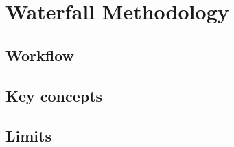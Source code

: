 \section{Waterfall Methodology}\label{sec:waterfall-methodology}


\subsection{Workflow}\label{subsec:workflow}

\subsection{Key concepts}\label{subsec:key-concepts}

\subsection{Limits}\label{subsec:limits}